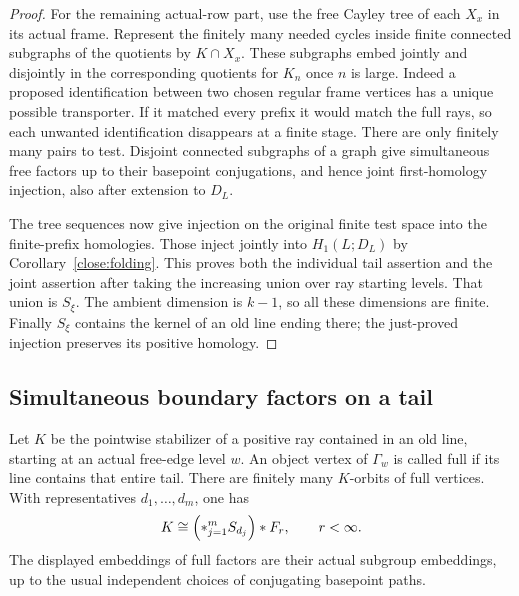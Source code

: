 \begin{proof}
For the remaining actual-row part, use the free Cayley tree of each
$X_x$ in its actual frame. Represent the finitely many needed cycles
inside finite connected subgraphs of the quotients by $K\cap X_x$.
These subgraphs embed jointly and disjointly in the corresponding
quotients for $K_n$ once $n$ is large. Indeed a proposed identification
between two chosen regular frame vertices has a unique possible
transporter. If it matched every prefix it would match the full
rays, so each unwanted identification disappears at a finite stage.
There are only finitely many pairs to test. Disjoint connected
subgraphs of a graph give simultaneous free factors up to their
basepoint conjugations, and hence joint first-homology injection,
also after extension to $D_L$.

The tree sequences now give injection on the original finite test
space into the finite-prefix homologies. Those inject jointly into
$H_1(L;D_L)$ by Corollary~\ref{close:folding}. This proves both the
individual tail assertion and the joint assertion after taking the
increasing union over ray starting levels. That union is $S_\xi$.
The ambient dimension is $k-1$, so all these dimensions are finite.
Finally $S_\xi$ contains the kernel of an old line ending there; the
just-proved injection preserves its positive homology.
\end{proof}

\subsection{Simultaneous boundary factors on a tail}

\begin{proposition}\label{close:tail-splitting}
Let $K$ be the pointwise stabilizer of a positive ray contained in an
old line, starting at an actual free-edge level $w$. An object vertex of $\Gamma_w$ is called full if
its line contains that entire tail. There are finitely many $K$-orbits
of full vertices. With representatives $d_1,\ldots,d_m$, one has
\begin{equation}\label{close:tail-product}
 K\cong\Bigl(*_{j=1}^m S_{d_j}\Bigr)*F_r,
 \qquad r<\infty.
\end{equation}
The displayed embeddings of full factors are their actual subgroup
embeddings, up to the usual independent choices of conjugating
basepoint paths.
\end{proposition}

